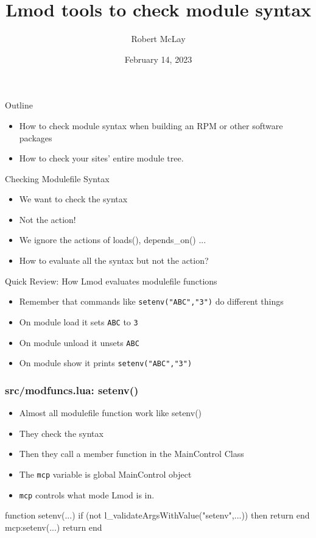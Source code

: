 \documentclass{beamer}
\begin{document}
\title[Lmod]{Lmod tools to check module syntax}
\author{Robert McLay} 
\date{February 14, 2023}

\frame{\titlepage} 


\begin{frame}{Outline}
  \begin{itemize}
    \item How to check module syntax when building an RPM or other
      software packages
    \item How to check your sites' entire module tree.
  \end{itemize}
\end{frame}

\begin{frame}{Checking Modulefile Syntax}
  \begin{itemize}
    \item We want to check the syntax
    \item Not the action!
    \item We ignore the actions of loads(), depends\_on() ...
    \item How to evaluate all the syntax but not the action?
  \end{itemize}
\end{frame}

\begin{frame}{Quick Review: How Lmod evaluates modulefile functions}
  \begin{itemize}
    \item Remember that commands like \texttt{setenv("ABC","3")} do
      different things
    \item On module load it sets \texttt{ABC} to \texttt{3}
    \item On module unload it unsets \texttt{ABC}
    \item On module show it prints \texttt{setenv("ABC","3")}
  \end{itemize}
\end{frame}

\begin{frame}[fragile]
    \frametitle{src/modfuncs.lua: setenv()}
  \begin{itemize}
    \item Almost all modulefile function work like setenv()
    \item They check the syntax
    \item Then they call a member function in the MainControl Class
    \item The \texttt{mcp} variable is global MainControl object
    \item \texttt{mcp} controls what mode Lmod is in.
  \end{itemize}
 {\tiny
    \begin{semiverbatim}
function setenv(...)
   if (not l_validateArgsWithValue("setenv",...)) then 
     return 
   end
   mcp:setenv(...)
   return
end
    \end{semiverbatim}
}
\end{frame}
\end{document}

